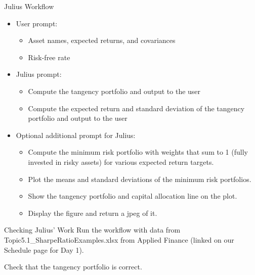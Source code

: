 \documentclass[10pt]{beamer}
\begin{document}
\begin{frame}{Julius Workflow}
  \begin{itemize}
  \item User prompt:
  \begin{itemize}
  \item Asset names, expected returns, and covariances
  \item Risk-free rate
  \end{itemize}
  \item Julius prompt:
  \begin{itemize}
  \item Compute the tangency portfolio and output to the user
  \item Compute the expected return and standard deviation of the tangency portfolio and output to the user
  \end{itemize}
  \item Optional additional prompt for Julius:
  \begin{itemize}
  \item Compute the minimum risk portfolio with weights that sum to 1 (fully invested in risky assets) for various expected return targets.
  \item  Plot the means and standard deviations of the minimum risk portfolios. 
  \item Show the tangency portfolio and capital allocation line on the plot.  
  \item Display the figure and return a jpeg of it.
  \end{itemize}
\end{itemize}
  \end{frame}
  
  \begin{frame}{Checking Julius' Work}
    Run the workflow with data from Topic5.1\_SharpeRatioExamples.xlsx from Applied Finance (linked on our Schedule page for Day 1).
    
    Check that the tangency portfolio is correct.
  \end{frame}
\end{document}
